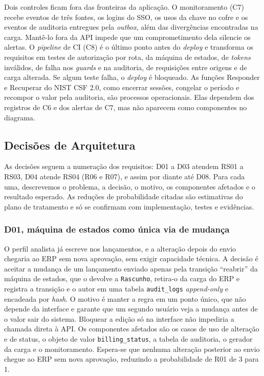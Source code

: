 \documentclass[conference]{IEEEtran}
\begin{document}
Dois controles ficam fora das fronteiras da aplicação. O monitoramento (C7) recebe eventos de três fontes, os logins do SSO, os usos da chave no cofre e os eventos de auditoria entregues pela \textit{outbox}, além das divergências encontradas na carga. Mantê-lo fora da API impede que um comprometimento dela silencie os alertas. O \textit{pipeline} de CI (C8) é o último ponto antes do \textit{deploy} e transforma os requisitos em testes de autorização por rota, da máquina de estados, de \textit{tokens} inválidos, de falha nos \textit{guards} e na auditoria, de requisições entre origens e de carga alterada. Se algum teste falha, o \textit{deploy} é bloqueado. As funções Responder e Recuperar do NIST CSF 2.0, como encerrar sessões, congelar o período e recompor o valor pela auditoria, são processos operacionais. Elas dependem dos registros de C6 e dos alertas de C7, mas não aparecem como componentes no diagrama.
\subsection{Decisões de Arquitetura}
\label{subsec:decisoes}

As decisões seguem a numeração dos requisitos: D01 a D03 atendem RS01 a RS03, D04 atende RS04 (R06 e R07), e assim por diante até D08. Para cada uma, descrevemos o problema, a decisão, o motivo, os componentes afetados e o resultado esperado. As reduções de probabilidade citadas são estimativas do plano de tratamento e só se confirmam com implementação, testes e evidências.

\subsubsection{D01, máquina de estados como única via de mudança}
O perfil analista já escreve nos lançamentos, e a alteração depois do envio chegaria ao ERP sem nova aprovação, sem exigir capacidade técnica. A decisão é aceitar a mudança de um lançamento enviado apenas pela transição ``reabrir'' da máquina de estados, que o devolve a \texttt{Rascunho}, retira-o da carga do ERP e registra a transição e o autor em uma tabela \texttt{audit\_logs} \textit{append-only} e encadeada por \textit{hash}. O motivo é manter a regra em um ponto único, que não depende da interface e garante que um segundo usuário veja a mudança antes de o valor sair do sistema. Bloquear a edição só na interface não impediria a chamada direta à API. Os componentes afetados são os casos de uso de alteração e de status, o objeto de valor \texttt{billing\_status}, a tabela de auditoria, o gerador da carga e o monitoramento. Espera-se que nenhuma alteração posterior ao envio chegue ao ERP sem nova aprovação, reduzindo a probabilidade de R01 de 3 para 1.
\end{document}
